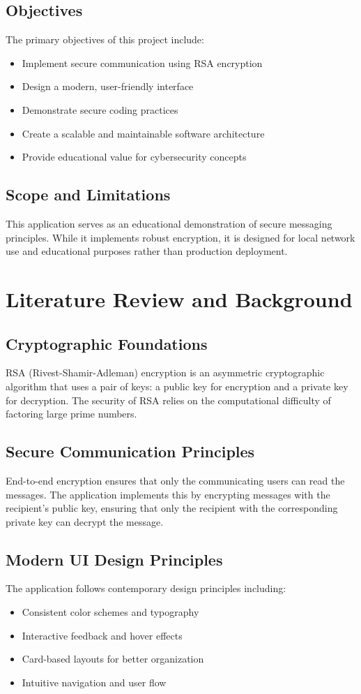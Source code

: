 \documentclass[12pt,a4paper]{article}
\begin{document}
\subsection{Objectives}
The primary objectives of this project include:
\begin{itemize}
    \item Implement secure communication using RSA encryption
    \item Design a modern, user-friendly interface
    \item Demonstrate secure coding practices
    \item Create a scalable and maintainable software architecture
    \item Provide educational value for cybersecurity concepts
\end{itemize}

\subsection{Scope and Limitations}
This application serves as an educational demonstration of secure messaging principles. While it implements robust encryption, it is designed for local network use and educational purposes rather than production deployment.

\section{Literature Review and Background}

\subsection{Cryptographic Foundations}
RSA (Rivest-Shamir-Adleman) encryption is an asymmetric cryptographic algorithm that uses a pair of keys: a public key for encryption and a private key for decryption. The security of RSA relies on the computational difficulty of factoring large prime numbers.

\subsection{Secure Communication Principles}
End-to-end encryption ensures that only the communicating users can read the messages. The application implements this by encrypting messages with the recipient's public key, ensuring that only the recipient with the corresponding private key can decrypt the message.

\subsection{Modern UI Design Principles}
The application follows contemporary design principles including:
\begin{itemize}
    \item Consistent color schemes and typography
    \item Interactive feedback and hover effects
    \item Card-based layouts for better organization
    \item Intuitive navigation and user flow
\end{itemize}
\end{document}
